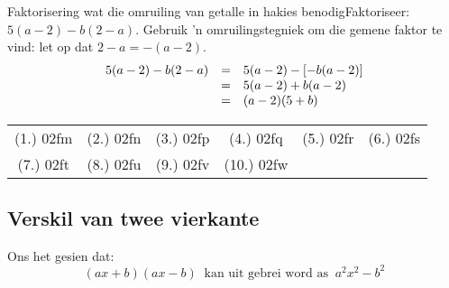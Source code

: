 \begin{wex}{ Faktorisering wat die omruiling van getalle in hakies benodig}{Faktoriseer: $5(a-2)-b(2-a)$. }{
Gebruik 'n omruilingstegniek om die gemene faktor te vind: let op dat $2-a = -(a-2)$.
\begin{equation*}
\begin{array}{ccl}
\hfill 5(a-2)-b(2-a)& =& \hfill 5(a-2)-[-b(a-2)]  \\
&= & 5(a-2)+b(a-2)\\ 
& =& (a-2)(5+b) \hfill
\end{array}
\end{equation*}
}
\end{wex}

% 
\par \practiceinfo
\par \begin{tabular}[h]{cccccc}
(1.)	02fm	&
(2.)	02fn	&
(3.)	02fp	&
(4.)	02fq	&
(5.)	02fr	&
(6.)	02fs	\\ %
(7.)	02ft	&
(8.)	02fu	&
(9.)	02fv	&
(10.)	02fw	&
\end{tabular}

\subsection* {Verskil van twee vierkante}
Ons het gesien dat: 
\begin{equation*}
(ax+b)(ax-b)~\mbox{ kan uit gebrei word as }~{a}^{2}{x}^{2}-{b}^{2}
\end{equation*}


